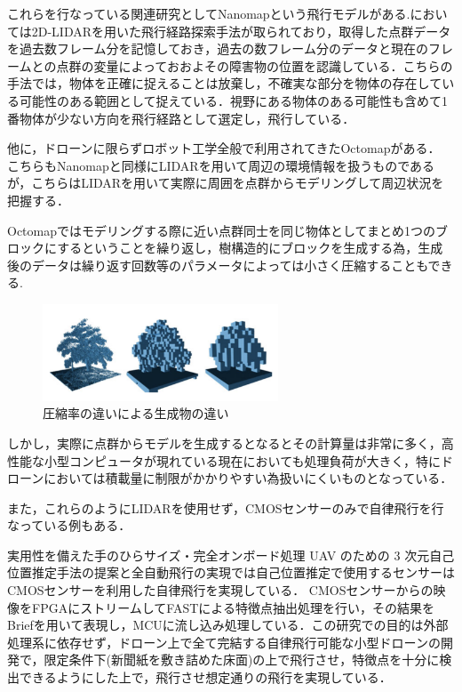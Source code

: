 これらを行なっている関連研究としてNanomap\cite{Nanomap}という飛行モデルがある.においては2D-LIDARを用いた飛行経路探索手法が取られており，取得した点群データを過去数フレーム分を記憶しておき，過去の数フレーム分のデータと現在のフレームとの点群の変量によっておおよその障害物の位置を認識している．こちらの手法では，物体を正確に捉えることは放棄し，不確実な部分を物体の存在している可能性のある範囲として捉えている．視野にある物体のある可能性も含めて1番物体が少ない方向を飛行経路として選定し，飛行している．

他に，ドローンに限らずロボット工学全般で利用されてきたOctomap\cite{Octomap}がある．
こちらもNanomapと同様にLIDARを用いて周辺の環境情報を扱うものであるが，こちらはLIDARを用いて実際に周囲を点群からモデリングして周辺状況を把握する．

Octomapではモデリングする際に近い点群同士を同じ物体としてまとめ1つのブロックにするということを繰り返し，樹構造的にブロックを生成する為，生成後のデータは繰り返す回数等のパラメータによっては小さく圧縮することもできる.
\begin{figure}[htbp]
  \begin{center}
    \includegraphics[clip,width=7.0cm]{img/octomap.png}
    \caption{圧縮率の違いによる生成物の違い}
    \label{fig:hamu}
  \end{center}
\end{figure}
しかし，実際に点群からモデルを生成するとなるとその計算量は非常に多く，高性能な小型コンピュータが現れている現在においても処理負荷が大きく，特にドローンにおいては積載量に制限がかかりやすい為扱いにくいものとなっている．


また，これらのようにLIDARを使用せず，CMOSセンサーのみで自律飛行を行なっている例もある．

実用性を備えた手のひらサイズ・完全オンボード処理 UAV のための 3 次元自己位置推定手法の提案と全自動飛行の実現\cite{SfMDrone}では自己位置推定で使用するセンサーはCMOSセンサーを利用した自律飛行を実現している．
CMOSセンサーからの映像をFPGAにストリームしてFAST\cite{FAST}による特徴点抽出処理を行い，その結果をBrief\cite{Brief}を用いて表現し，MCUに流し込み処理している．この研究での目的は外部処理系に依存せず，ドローン上で全て完結する自律飛行可能な小型ドローンの開発で，限定条件下(新聞紙を敷き詰めた床面)の上で飛行させ，特徴点を十分に検出できるようにした上で，飛行させ想定通りの飛行を実現している．

